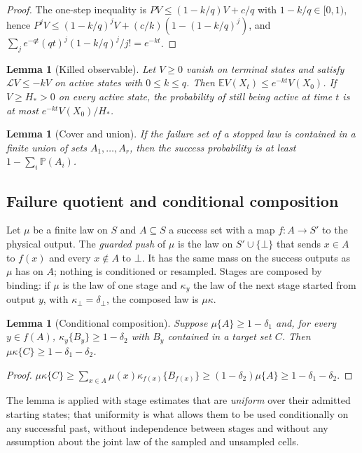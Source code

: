 \documentclass[11pt,a4paper]{article}
\theoremstyle{plain}
\newtheorem{lemma}[theorem]{Lemma}
\theoremstyle{definition}
\theoremstyle{remark}
\newcommand{\Prob}{\mathbb P}
\newcommand{\E}{\mathbb E}
\newcommand{\gen}{\mathcal L}
\newcommand{\fail}{\bot}
\begin{document}
\begin{proof}
The one-step inequality is $PV\le(1-k/q)V+c/q$ with $1-k/q\in[0,1)$, hence $P^jV\le(1-k/q)^jV+(c/k)(1-(1-k/q)^j)$, and $\sum_je^{-qt}(qt)^j(1-k/q)^j/j!=e^{-kt}$.
\end{proof}

\begin{lemma}[Killed observable]\label{lem:killed}
Let $V\ge0$ vanish on terminal states and satisfy $\gen V\le-kV$ on active states with $0\le k\le q$. Then $\E V(X_t)\le e^{-kt}V(X_0)$. If $V\ge H_*>0$ on every active state, the probability of still being active at time $t$ is at most $e^{-kt}V(X_0)/H_*$.
\end{lemma}

\begin{lemma}[Cover and union]\label{lem:union}
If the failure set of a stopped law is contained in a finite union of sets $A_1,\dots,A_r$, then the success probability is at least $1-\sum_i\Prob(A_i)$.
\end{lemma}

\subsection{Failure quotient and conditional composition}\label{sec:composition}
Let $\mu$ be a finite law on $S$ and $A\subseteq S$ a success set with a map $f:A\to S'$ to the physical output. The \emph{guarded push} of $\mu$ is the law on $S'\cup\{\fail\}$ that sends $x\in A$ to $f(x)$ and every $x\notin A$ to $\fail$. It has the same mass on the success outputs as $\mu$ has on $A$; nothing is conditioned or resampled. Stages are composed by binding: if $\mu$ is the law of one stage and $\kappa_y$ the law of the next stage started from output $y$, with $\kappa_\fail=\delta_\fail$, the composed law is $\mu\kappa$.

\begin{lemma}[Conditional composition]\label{lem:compose}
Suppose $\mu\{A\}\ge1-\delta_1$ and, for every $y\in f(A)$, $\kappa_y\{B_y\}\ge1-\delta_2$ with $B_y$ contained in a target set $C$. Then $\mu\kappa\{C\}\ge1-\delta_1-\delta_2$.
\end{lemma}

\begin{proof}
$\mu\kappa\{C\}\ge\sum_{x\in A}\mu(x)\kappa_{f(x)}\{B_{f(x)}\}\ge(1-\delta_2)\mu\{A\}\ge1-\delta_1-\delta_2$.
\end{proof}

The lemma is applied with stage estimates that are \emph{uniform} over their admitted starting states; that uniformity is what allows them to be used conditionally on any successful past, without independence between stages and without any assumption about the joint law of the sampled and unsampled cells.
\end{document}
